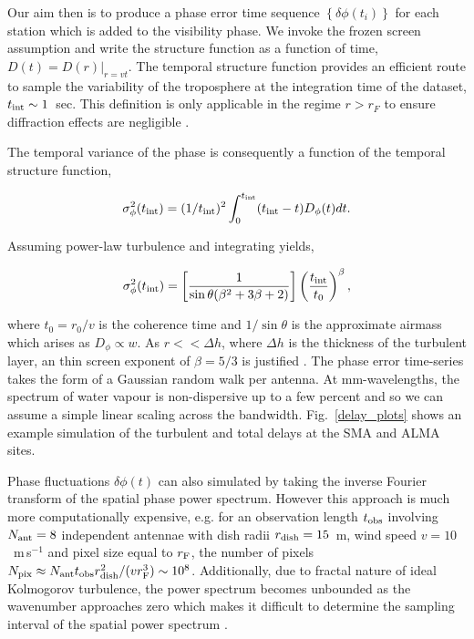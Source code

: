 Our aim then is to produce a phase error time sequence $\left\{\delta \phi(t_i)\right\}$ for each station which is added to the visibility phase. We invoke the frozen screen assumption and write the structure function as a function of time, $D (t) =  D(r)|_{r=vt}$. The temporal structure function provides an efficient route to sample the variability of the troposphere at the integration time of the dataset, $t_{\rm int} \sim 1$~sec. This definition is only applicable in the regime $r > r_F$ to ensure diffraction effects are negligible \cite{Thompson_2001}. 


The temporal variance of the phase is consequently a function of the temporal structure function, \citep*{Treuhaft_1987} 

\begin{equation}
\sigma^2_{\phi}(t_{\rm int}) = (1/t_{\rm int})^2 \int_{0}^{t_{\rm int}} (t_{\rm int}-t) D_{\phi}(t) dt.
\end{equation}

Assuming power-law turbulence and integrating yields, 

\begin{equation}
\sigma^2_\phi (t_{\rm int})=\left[\frac{1}{\sin\theta(\beta^2 +3\beta +2)}\right]\left(\frac{t_{\rm int}}{t_0}\right)^{\beta},
\end{equation}


\noindent where $t_0 = r_0/v$ is the coherence time and $1/\sin\theta$ is the approximate airmass which arises as $D_\phi \propto w$. As $r<<\Delta h$, where $\Delta h$ is the thickness of the turbulent layer, an thin screen exponent of $\beta = 5/3$ is justified \citep*{Treuhaft_1987}. The phase error time-series takes the form of a Gaussian random walk per antenna. At mm-wavelengths, the spectrum of water vapour is non-dispersive up to a few percent \cite{Curtis_2009} and so we can assume a simple linear scaling across the bandwidth. Fig.~\ref{delay_plots} shows an example simulation of the turbulent and total delays at the SMA and ALMA sites.


Phase fluctuations $\delta\phi(t)$ can also simulated by taking the inverse Fourier transform of the spatial phase power spectrum. However this approach is much more computationally expensive, e.g. for an observation length $t_{\rm obs}$ involving $N_{\rm ant}=8$ independent antennae with dish radii $r_{\rm dish}=15$~m, wind speed $v=10$~m\,s$^{-1}$ and pixel size equal to $r_{\rm F}$, the number of pixels $N_{\rm pix} \approx N_{\rm ant} t_{\rm obs} r_{\rm dish}^2/(v r_{\rm F}^3)  \sim 10^8$. Additionally, due to fractal nature of ideal Kolmogorov turbulence, the power spectrum becomes unbounded as the wavenumber approaches zero which makes it difficult to determine the sampling interval of the spatial power spectrum \cite{Lane_1992}. 


